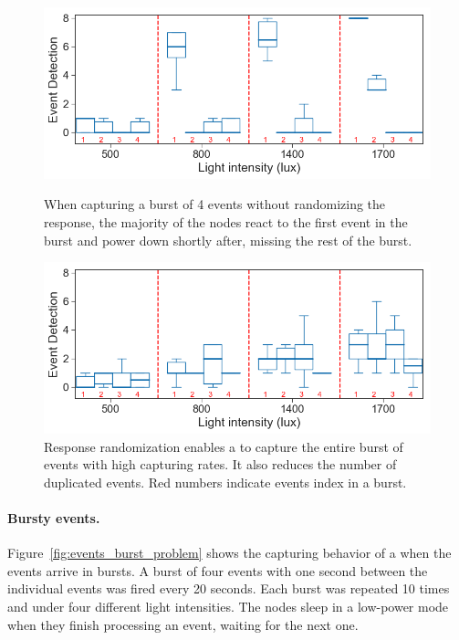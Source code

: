 \begin{figure}[t]
    \includegraphics[width=\columnwidth]{figures/events_burst_problem_2}
	\caption{When capturing a burst of 4 events without randomizing the response, the majority of the nodes react to the first event in the burst and power down shortly after, missing the rest of the burst.}
    \label{fig:events_burst_problem}
\vspace*{3ex}
	\centering
     \includegraphics[width=\columnwidth]{figures/events_burst_rand_2}
    \caption{Response randomization enables a \cis to capture the entire burst of events with high capturing rates. It also reduces the number of duplicated events. Red numbers indicate events index in a burst.}
    \label{fig:events_burst_rand}
\end{figure}

\paragraph{Bursty events.}
Figure~\ref{fig:events_burst_problem} shows the capturing behavior of a \cis when the events arrive in bursts. A burst of four events with one second between the individual events was fired every 20 seconds. Each burst was repeated 10 times and under four different light intensities. The nodes sleep in a low-power mode when they finish processing an event, waiting for the next one. 

